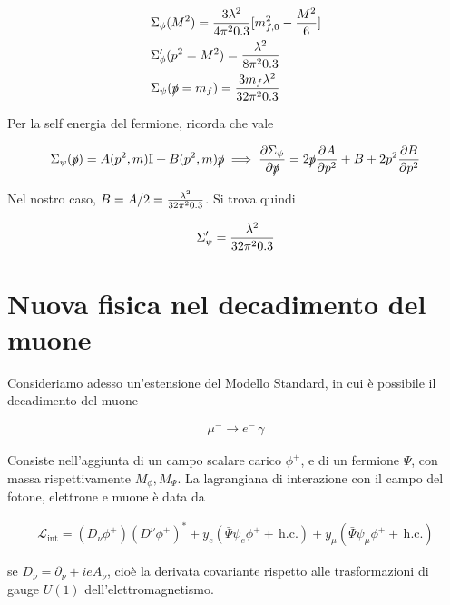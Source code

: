 \documentclass[11pt]{report}
\begin{document}
\begin{align}
    &\Sigma_\phi (M^2) = \frac{3\lambda^2}{4\pi^20.3}[m_{f,0}^2 - \frac{M^2}{6}] \notag \\ 
    &\Sigma'_\phi(p^2 = M^2) = \frac{\lambda^2}{8\pi^20.3} \notag \\ 
    &\Sigma_\psi(\slashed{p} = m_f) = \frac{3m_f\lambda^2}{32\pi^20.3}
\end{align}

Per la self energia del fermione, ricorda che vale 

\begin{align}
    \Sigma_\psi (\slashed{p}) = A(p^2, m)\mathbb{I} + B(p^2, m)\slashed{p} \implies \frac{\partial \Sigma_\psi}{\partial \slashed{p}} = 2\slashed{p}\frac{\partial A}{\partial p^2} + B + 2p^2\frac{\partial B}{\partial p^2}
\end{align}


Nel nostro caso, \(B = A/2 = \frac{\lambda^2}{32\pi^20.3}\). Si trova quindi 

\begin{align}
    \Sigma'_\psi = \frac{\lambda^2}{32\pi^20.3}
\end{align}

\newpage 

\section{Nuova fisica nel decadimento del muone}

Consideriamo adesso un'estensione del Modello Standard, in cui è possibile il decadimento del muone 

\begin{align}
    \mu^- \to e^- \, \gamma
\end{align}

Consiste nell'aggiunta di un campo scalare carico \(\phi^+\), e di un fermione \(\Psi\), con massa rispettivamente \(M_\phi, M_\Psi\). La lagrangiana di interazione con il campo del fotone, elettrone e muone è data da 

\begin{align}
    \mathcal{L}_{\text{int}} = (D_\nu \phi^+)(D^\nu \phi^+)^* + y_e (\bar{\Psi}\psi_e \phi^+ + \, \text{h.c.}) + y_\mu (\bar{\Psi}\psi_\mu \phi^+ + \, \text{h.c.})
\end{align}

se \(D_\nu = \partial_\nu + ieA_\nu\), cioè la derivata covariante rispetto alle trasformazioni di gauge \(U(1)\) dell'elettromagnetismo. 
\end{document}
